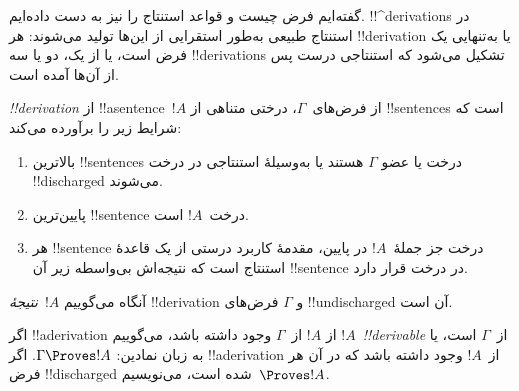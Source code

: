 \documentclass[../../../include/open-logic-section]{subfiles}
\begin{document}
      {}
      {}


\begin{explain}
گفته‌ایم فرض چیست و قواعد استنتاج را نیز به دست داده‌ایم.
!!^{derivation}s در استنتاج طبیعی به‌طور استقرایی از این‌ها تولید
می‌شوند: هر !!{derivation} یا به‌تنهایی یک فرض است، یا از یک، دو یا سه
!!{derivation}s تشکیل می‌شود که استنتاجی درست پس از آن‌ها آمده است.
\end{explain}

\begin{defn}[!!^{derivation}]
 \emph{!!{derivation}} از !!a{sentence}~$!A$ از
فرض‌های~$\Gamma$، درختی متناهی از !!{sentence}s است که شرایط زیر را
برآورده می‌کند:
\begin{enumerate}
\item بالاترین !!{sentence}s درخت یا عضو $\Gamma$ هستند یا به‌وسیلهٔ
  استنتاجی در درخت !!{discharged} می‌شوند.
\item پایین‌ترین !!{sentence} درخت~$!A$ است.
\item هر !!{sentence} درخت جز جملهٔ~$!A$ در پایین، مقدمهٔ کاربرد درستی
  از یک قاعدهٔ استنتاج است که نتیجه‌اش بی‌واسطه زیر آن !!{sentence} در
  درخت قرار دارد.
\end{enumerate}
آنگاه می‌گوییم $!A$~\emph{نتیجهٔ} !!{derivation} و $\Gamma$ فرض‌های
!!{undischarged} آن است.

اگر !!a{derivation} از $!A$ از~$\Gamma$ وجود داشته باشد، می‌گوییم
$!A$~\emph{!!{derivable}} از~$\Gamma$ است، یا به زبان نمادین:
$\Gamma \Proves !A$. اگر !!a{derivation} از~$!A$ وجود داشته باشد که در
آن هر فرض !!{discharged} شده است، می‌نویسیم~$\Proves !A$.
\end{defn}
\end{document}
